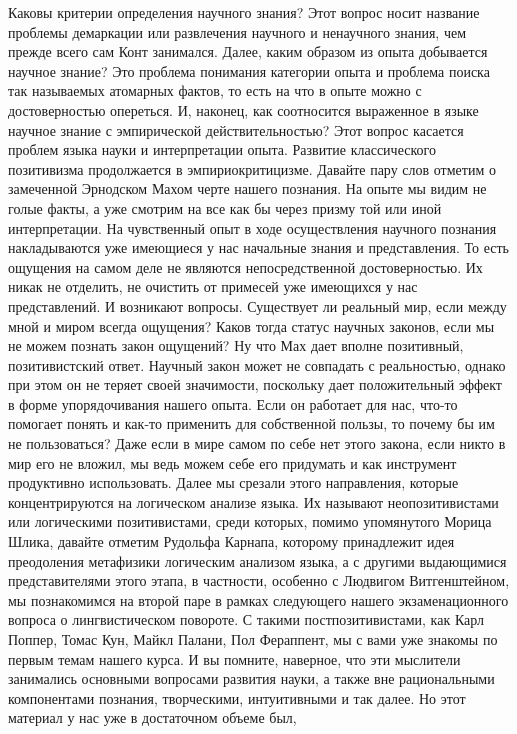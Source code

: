 Каковы критерии определения научного знания? Этот вопрос носит название проблемы
демаркации или развлечения научного и ненаучного знания, чем прежде всего сам
Конт занимался. Далее, каким образом из опыта добывается научное знание? Это
проблема понимания категории опыта и проблема поиска так называемых атомарных
фактов, то есть на что в опыте можно с достоверностью опереться. И, наконец, как
соотносится выраженное в языке научное знание с эмпирической действительностью?
Этот вопрос касается проблем языка науки и интерпретации опыта. Развитие
классического позитивизма продолжается в эмпириокритицизме. Давайте пару слов
отметим о замеченной Эрнодском Махом черте нашего познания. На опыте мы видим не
голые факты, а уже смотрим на все как бы через призму той или иной
интерпретации. На чувственный опыт в ходе осуществления научного познания
накладываются уже имеющиеся у нас начальные знания и представления. То есть
ощущения на самом деле не являются непосредственной достоверностью. Их никак не
отделить, не очистить от примесей уже имеющихся у нас представлений. И возникают
вопросы. Существует ли реальный мир, если между мной и миром всегда ощущения?
Каков тогда статус научных законов, если мы не можем познать закон ощущений? Ну
что Мах дает вполне позитивный, позитивистский ответ. Научный закон может не
совпадать с реальностью, однако при этом он не теряет своей значимости,
поскольку дает положительный эффект в форме упорядочивания нашего опыта. Если он
работает для нас, что-то помогает понять и как-то применить для собственной
пользы, то почему бы им не пользоваться? Даже если в мире самом по себе нет
этого закона, если никто в мир его не вложил, мы ведь можем себе его придумать и
как инструмент продуктивно использовать. Далее мы срезали этого направления,
которые концентрируются на логическом анализе языка. Их называют
неопозитивистами или логическими позитивистами, среди которых, помимо
упомянутого Морица Шлика, давайте отметим Рудольфа Карнапа, которому принадлежит
идея преодоления метафизики логическим анализом языка, а с другими выдающимися
представителями этого этапа, в частности, особенно с Людвигом Витгенштейном, мы
познакомимся на второй паре в рамках следующего нашего экзаменационного вопроса
о лингвистическом повороте. С такими постпозитивистами, как Карл Поппер, Томас
Кун, Майкл Палани, Пол Фераппент, мы с вами уже знакомы по первым темам нашего
курса. И вы помните, наверное, что эти мыслители занимались основными вопросами
развития науки, а также вне рациональными компонентами познания, творческими,
интуитивными и так далее. Но этот материал у нас уже в достаточном объеме был,
